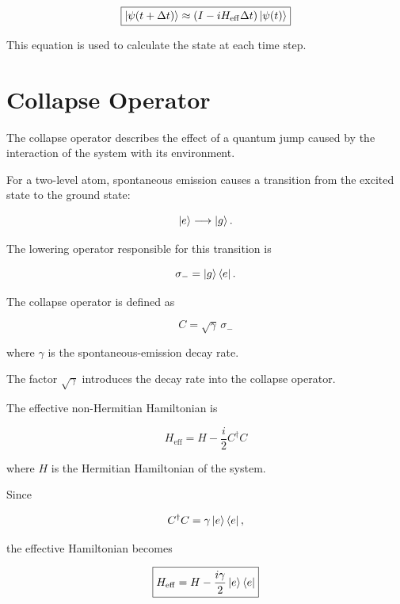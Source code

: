 \documentclass[12pt,a4paper]{report}
\begin{document}
\begin{equation}
\boxed{
\ket{\psi(t+\Delta t)}
\approx
\left(I-iH_{\mathrm{eff}}\Delta t\right)
\ket{\psi(t)}
}
\end{equation}

This equation is used to calculate the state at each
time step.

\section{Collapse Operator}

The collapse operator describes the effect of a
quantum jump caused by the interaction of the system
with its environment.

For a two-level atom, spontaneous emission causes
a transition from the excited state to the ground state:

\begin{equation}
\ket{e}\longrightarrow\ket{g}.
\end{equation}

The lowering operator responsible for this transition is

\begin{equation}
\sigma_-=\ket{g}\bra{e}.
\end{equation}

The collapse operator is defined as

\begin{equation}
\boxed{
C=\sqrt{\gamma}\,\sigma_-
}
\end{equation}

where $\gamma$ is the spontaneous-emission decay rate.

The factor $\sqrt{\gamma}$ introduces the decay rate
into the collapse operator.

The effective non-Hermitian Hamiltonian is

\begin{equation}
\boxed{
H_{\mathrm{eff}}
=
H-\frac{i}{2}C^\dagger C
}
\end{equation}

where $H$ is the Hermitian Hamiltonian of the system.

Since

\begin{equation}
C^\dagger C
=
\gamma\ket{e}\bra{e},
\end{equation}

the effective Hamiltonian becomes

\begin{equation}
\boxed{
H_{\mathrm{eff}}
=
H-\frac{i\gamma}{2}\ket{e}\bra{e}
}
\end{equation}
\end{document}
